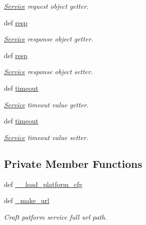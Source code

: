 \begin{DoxyCompactItemize}
\begin{DoxyCompactList}\small\item\em \hyperlink{namespaceRappCloud_1_1Service}{Service} request object getter. \end{DoxyCompactList}\item 
def \hyperlink{classRappCloud_1_1Service_1_1RappPlatformService_1_1RappPlatformService_a6faef1c9bac111ed93af1b87dc5db5c7}{resp}
\begin{DoxyCompactList}\small\item\em \hyperlink{namespaceRappCloud_1_1Service}{Service} response object getter. \end{DoxyCompactList}\item 
def \hyperlink{classRappCloud_1_1Service_1_1RappPlatformService_1_1RappPlatformService_a6faef1c9bac111ed93af1b87dc5db5c7}{resp}
\begin{DoxyCompactList}\small\item\em \hyperlink{namespaceRappCloud_1_1Service}{Service} response object setter. \end{DoxyCompactList}\item 
def \hyperlink{classRappCloud_1_1Service_1_1RappPlatformService_1_1RappPlatformService_ae8bf321086348099e0fd7c212a23ad81}{timeout}
\begin{DoxyCompactList}\small\item\em \hyperlink{namespaceRappCloud_1_1Service}{Service} timeout value getter. \end{DoxyCompactList}\item 
def \hyperlink{classRappCloud_1_1Service_1_1RappPlatformService_1_1RappPlatformService_ae8bf321086348099e0fd7c212a23ad81}{timeout}
\begin{DoxyCompactList}\small\item\em \hyperlink{namespaceRappCloud_1_1Service}{Service} timeout value setter. \end{DoxyCompactList}\end{DoxyCompactItemize}
\subsection*{Private Member Functions}
\begin{DoxyCompactItemize}
\item 
def \hyperlink{classRappCloud_1_1Service_1_1RappPlatformService_1_1RappPlatformService_a64f188d28b56c07fd3648c80f55dc0c3}{\-\_\-\-\_\-load\-\_\-platform\-\_\-cfg}
\item 
def \hyperlink{classRappCloud_1_1Service_1_1RappPlatformService_1_1RappPlatformService_aff858d6ef9f57dcb65b6949dd0dc1aeb}{\-\_\-make\-\_\-url}
\begin{DoxyCompactList}\small\item\em Craft patform service full url path. \end{DoxyCompactList}\end{DoxyCompactItemize}
